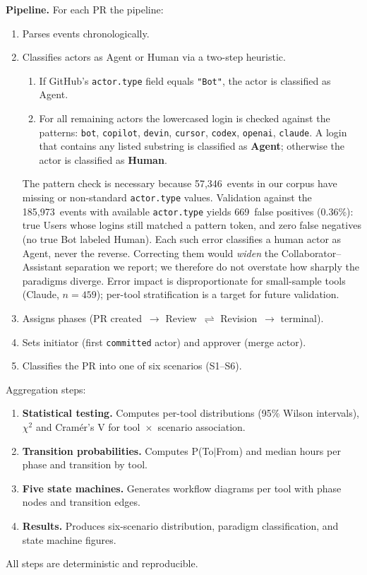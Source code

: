 \documentclass[sigconf]{acmart}
\newcommand{\CompactListSpacing}{%
  \setlength{\itemsep}{1pt plus 0.5pt minus 0.5pt}%
  \setlength{\parsep}{0pt}%
  \setlength{\topsep}{4pt plus 1pt minus 1pt}%
  \setlength{\partopsep}{0pt}%
}
\begin{document}
\textbf{Pipeline.} For each PR the pipeline:
\begin{enumerate}\CompactListSpacing
    \item Parses events chronologically.
    \item Classifies actors as Agent or Human via a two-step
    heuristic.
    \begin{enumerate}\CompactListSpacing
    \item If GitHub's \texttt{actor.type} field equals
    \texttt{"Bot"}, the actor is classified as Agent.
    \item For all remaining actors the lowercased login is
    checked against the patterns: \texttt{bot},
    \texttt{copilot}, \texttt{devin}, \texttt{cursor},
    \texttt{codex}, \texttt{openai}, \texttt{claude}.
    A login that contains any listed substring is classified as
    \textbf{Agent}; otherwise the actor is classified as
    \textbf{Human}.
    \end{enumerate}
    The pattern check is necessary because 57,346~events in our corpus
    have missing or non-standard \texttt{actor.type} values.
    Validation against the 185,973~events with available
    \texttt{actor.type} yields 669~false positives
    (0.36\%): true Users whose logins still matched a pattern
    token, and zero false negatives (no true Bot labeled Human).
    Each such error classifies a human actor as Agent, never the
    reverse.
    Correcting them would \emph{widen} the Collaborator--Assistant
    separation we report; we therefore do not overstate how sharply
    the paradigms diverge.
    Error impact is disproportionate for small-sample tools
    (Claude, $n = 459$); per-tool stratification is a
    target for future validation.
    \item Assigns phases (PR created~$\to$
    Review~$\rightleftharpoons$ Revision~$\to$ terminal).
    \item Sets initiator (first \texttt{committed} actor) and
    approver (merge actor).
    \item Classifies the PR into one of six scenarios (S1--S6).
\end{enumerate}
Aggregation steps:
\begin{enumerate}\CompactListSpacing
    \setcounter{enumi}{5}
    \item \textbf{Statistical testing.} Computes per-tool distributions
    (95\% Wilson intervals), $\chi^2$ and Cram\'er's V for
    tool~$\times$~scenario association.
    \item \textbf{Transition probabilities.} Computes P(To$|$From) and
    median hours per phase and transition by tool.
    \item \textbf{Five state machines.} Generates workflow diagrams
    per tool with phase nodes and transition edges.
    \item \textbf{Results.} Produces six-scenario distribution,
    paradigm classification, and state machine figures.
\end{enumerate}
All steps are deterministic and reproducible.
\end{document}
